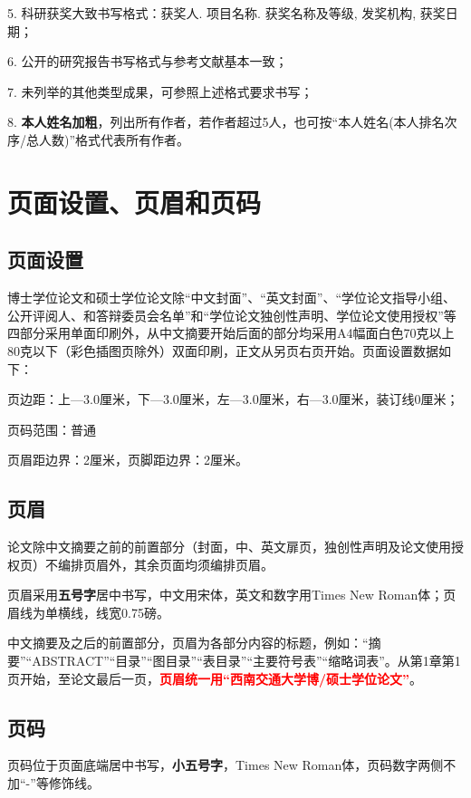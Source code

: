5. 科研获奖大致书写格式：获奖人. 项目名称. 获奖名称及等级, 发奖机构, 获奖日期；

6. 公开的研究报告书写格式与参考文献基本一致；

7. 未列举的其他类型成果，可参照上述格式要求书写；

8. \textbf{本人姓名加粗}，列出所有作者，若作者超过5人，也可按“本人姓名(本人排名次序/总人数)”格式代表所有作者。

\section{页面设置、页眉和页码}

\subsection{页面设置}

博士学位论文和硕士学位论文除“中文封面”、“英文封面”、“学位论文指导小组、公开评阅人、和答辩委员会名单”和“学位论文独创性声明、学位论文使用授权”等四部分采用单面印刷外，从中文摘要开始后面的部分均采用A4幅面白色70克以上80克以下（彩色插图页除外）双面印刷，正文从另页右页开始。页面设置数据如下：

页边距：上—3.0厘米，下—3.0厘米，左—3.0厘米，右—3.0厘米，装订线0厘米；

页码范围：普通

页眉距边界：2厘米，页脚距边界：2厘米。

\subsection{页眉}

论文除中文摘要之前的前置部分（封面，中、英文扉页，独创性声明及论文使用授权页）不编排页眉外，其余页面均须编排页眉。

页眉采用\textbf{五号字}居中书写，中文用宋体，英文和数字用Times New Roman体；页眉线为单横线，线宽0.75磅。

中文摘要及之后的前置部分，页眉为各部分内容的标题，例如：“摘要”“ABSTRACT”“目录”“图目录”“表目录”“主要符号表”“缩略词表”。从第1章第1页开始，至论文最后一页，\textcolor{red}{\textbf{页眉统一用“西南交通大学博/硕士学位论文”}}。

\subsection{页码}

页码位于页面底端居中书写，\textbf{小五号字}，Times New Roman体，页码数字两侧不加“-”等修饰线。

